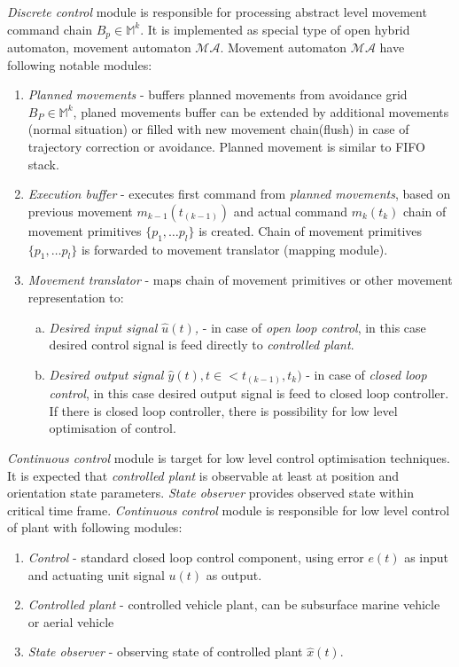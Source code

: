 \noindent \textit{Discrete control} module is responsible for processing abstract level movement command chain $B_p \in \mathbb{M}^k$. It is implemented as special type of open hybrid automaton, movement automaton $\mathscr{MA}$. Movement automaton $\mathscr{MA}$ have following notable modules:
\begin{enumerate}
    \item \textit{Planned movements} - buffers planned movements from avoidance grid $B_P\in\mathbb{M}^k$, planed movements buffer can be extended by additional movements (normal situation) or filled with new movement chain(flush) in case of trajectory correction or avoidance. Planned movement is similar to FIFO stack.
    \item \textit{Execution buffer} - executes first command from \textit{planned movements}, based on previous movement $m_{k-1}(t_{(k-1)})$ and actual command $m_k(t_k)$ chain of movement primitives $\{p_1, \dots p_l\}$ is created. Chain of movement primitives $\{p_1, \dots p_l\}$ is forwarded to movement translator (mapping module).
    \item \textit{Movement translator} - maps chain of movement primitives or other movement representation to:
    \begin{enumerate}[a.]
        \item \textit{Desired input signal $\hat{u}(t)$,} - in case of \textit{open loop control}, in this case desired control signal is feed directly to \textit{controlled plant}.
        \item \textit{Desired output signal $\hat{y}(t),t\in<t_{(k-1)},t_k)$} - in case of \textit{closed loop control}, in this case desired output signal is feed to closed loop controller. If there is closed loop controller, there is possibility for low level optimisation of control.
    \end{enumerate}
\end{enumerate}

\noindent \textit{Continuous control} module is target for low level control optimisation techniques. It is expected that \textit{controlled plant} is observable at least at position and orientation state parameters. \textit{State observer} provides observed state within critical time frame. \textit{Continuous control} module is responsible for low level control of plant with following modules:
\begin{enumerate}
    \item \textit{Control} - standard closed loop control component, using error $e(t)$ as input and actuating unit signal $u(t)$ as output.
    \item \textit{Controlled plant} - controlled vehicle plant, can be subsurface marine vehicle or aerial vehicle
    \item \textit{State observer} - observing state of controlled plant $\hat{x}(t)$.
\end{enumerate}

